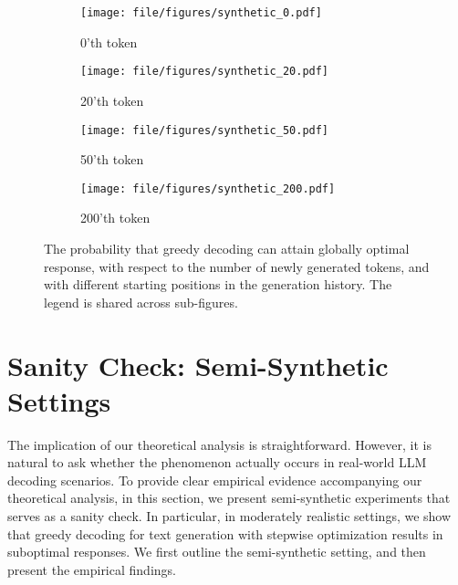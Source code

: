 \begin{figure*}[t]
    \centering
    \begin{subfigure}[b]{0.22\textwidth}
        \centering
        \texttt{[image: file/figures/synthetic\_0.pdf]}
        \caption{0'th token}
        \label{fig:subfig1}
    \end{subfigure}%
    \begin{subfigure}[b]{0.22\textwidth}
        \centering
        \texttt{[image: file/figures/synthetic\_20.pdf]}
        \caption{20'th token}
        \label{fig:subfig2}
    \end{subfigure}%
    \begin{subfigure}[b]{0.22\textwidth}
        \centering
        \texttt{[image: file/figures/synthetic\_50.pdf]}
        \caption{50'th token}
        \label{fig:subfig3}
    \end{subfigure}%
    \begin{subfigure}[b]{0.22\textwidth}
        \centering
        \texttt{[image: file/figures/synthetic\_200.pdf]}
        \caption{200'th token}
        \label{fig:subfig4}
    \end{subfigure}%
    \begin{subfigure}[b]{0.12\textwidth}
        \centering
        \label{fig:subfig5}
    \end{subfigure}
    \caption{%
        The probability that greedy decoding can attain globally optimal response, with respect to the number of newly generated tokens, and with different starting positions in the generation history.
        The legend is shared across sub-figures.
    }
    \label{fig:synthetic_setting}
\end{figure*}

\section{Sanity Check: Semi-Synthetic Settings}\label{main:synthetic}
The implication of our theoretical analysis is straightforward.
However, it is natural to ask whether the phenomenon actually occurs in real-world LLM decoding scenarios.
To provide clear empirical evidence accompanying our theoretical analysis, in this section, we present semi-synthetic experiments that serves as a sanity check.
In particular, in moderately realistic settings, we show that greedy decoding for text generation with stepwise optimization results in suboptimal responses.
We first outline the semi-synthetic setting, and then present the empirical findings.

